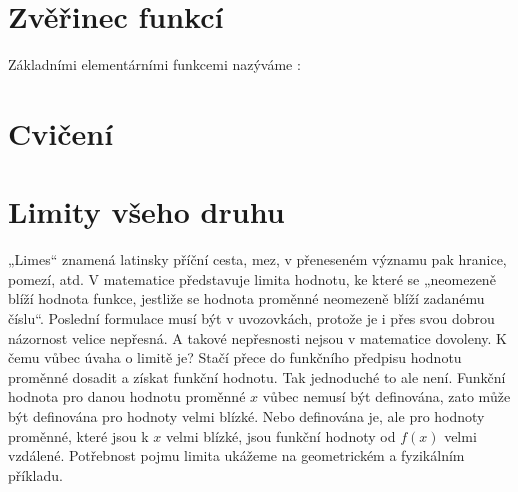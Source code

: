   \section{Zvěřinec funkcí}\label{mai:IchapIIIsecII}
    Základními elementárními funkcemi nazýváme \cite[s.~10]{PolakMA1}:
     
  \section{Cvičení}\label{mai:IchapIIIsecIII}
  
  \section{Limity všeho druhu}\label{mai:IchapIIIsecIV}  
    „Limes“ znamená latinsky příční cesta, mez, v přeneseném významu pak hranice, pomezí, atd. V 
    matematice představuje limita hodnotu, ke které se „neomezeně blíží hodnota funkce, jestliže se 
    hodnota proměnné neomezeně blíží zadanému číslu“. Poslední formulace musí být v uvozovkách, 
    protože je i přes svou dobrou názornost velice nepřesná. A takové nepřesnosti nejsou v 
    matematice dovoleny. K čemu vůbec úvaha o limitě je? Stačí přece do funkčního předpisu hodnotu 
    proměnné dosadit a získat funkční hodnotu. Tak jednoduché to ale není. Funkční hodnota pro 
    danou hodnotu proměnné \(x\) vůbec nemusí být definována, zato může být definována pro hodnoty 
    velmi blízké. Nebo definována je, ale pro hodnoty proměnné, které jsou k \(x\) velmi blízké, 
    jsou funkční hodnoty od \(f(x)\) velmi vzdálené. Potřebnost pojmu limita ukážeme na 
    geometrickém a fyzikálním příkladu.
    
